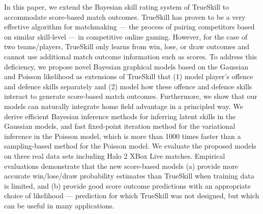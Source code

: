 In this paper, we extend the Bayesian skill rating system of TrueSkill to accommodate
score-based match outcomes. TrueSkill has proven to be a very
effective algorithm for matchmaking --- the process of pairing
competitors based on similar skill-level --- in competitive online
gaming. However, for the case of two teams/players, TrueSkill only
learns from win, lose, or draw outcomes and cannot use additional
match outcome information such as scores. To address this deficiency,
we propose novel Bayesian graphical models based on the Gaussian and Poisson likelihood as extensions of TrueSkill
that (1) model player's offence and defence skills separately and (2)
model how these offence and defence skills interact to generate
score-based match outcomes. Furthermore, we show that our models can naturally integrate home field advantage in a principled way. We derive efficient Bayesian inference methods for inferring latent skills in the Gaussian models, and fast fixed-point iteration method for the variational inference in the Poisson model, which is more than 1000 times faster than a sampling-based method for the Poisson model. We evaluate the proposed models on three real data sets including Halo 2 XBox Live matches. Empirical evaluations demonstrate that the new score-based models (a) provide more accurate win/lose/draw probability estimates than TrueSkill when training data is limited, and (b) provide good score outcome predictions with an appropriate choice of likelihood --- prediction for which TrueSkill was not designed, but which can be useful in many applications.